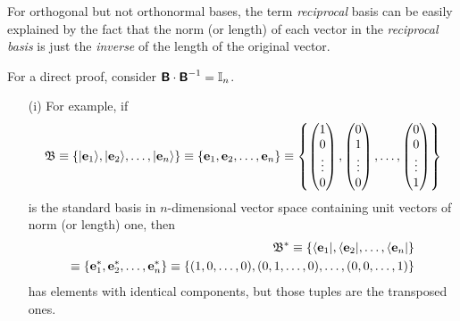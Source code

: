For orthogonal but not orthonormal bases, the term {\em reciprocal} basis
can be easily explained by the fact that the norm (or length) of each vector in the {\em reciprocal basis}
is just the {\em inverse} of the length of the original vector.

{\color{OliveGreen}
\bproof
For a direct proof, consider $\textsf{\textbf{B}}\cdot \textsf{\textbf{B}}^{-1} ={\Bbb I}_n$.
\eproof
}


{\color{blue}
\bexample
\begin{itemize}
\item[(i)]
For example,
if
\begin{equation}
{\frak B}
\equiv
\{ \vert {\bf e}_1 \rangle ,\vert  {\bf e}_2\rangle ,\ldots ,\vert {\bf e}_n\rangle  \}
\equiv
\{{\bf e}_1, {\bf e}_2,\ldots ,{\bf e}_n\}
\equiv
\left\{
\begin{pmatrix}
1\\
0\\
\vdots \\
0
\end{pmatrix}
,
\begin{pmatrix}
0\\
1\\
\vdots \\
0
\end{pmatrix}
,
\ldots ,
\begin{pmatrix}
0\\
0\\
\vdots \\
1
\end{pmatrix}
\right\}
\end{equation}
is the standard basis in $n$-dimensional vector space containing unit vectors of norm (or length) one,
then
\begin{equation}
\begin{split}
{\frak B}^\ast
\equiv
\{ \langle {\bf e}_1 \vert , \langle {\bf e}_2 \vert , \ldots ,\langle {\bf e}_n \vert \}
\\
\equiv
\{{\bf e}_1^\ast  ,{\bf e}_2^\ast , \ldots ,{\bf e}_n^\ast  \}
\equiv
\left\{
(1,0,\ldots,0),
(0,1,\ldots,0),
\ldots,
(0,0,\ldots,1)
\right\}
\end{split}
\end{equation}
has elements with identical components,
but those tuples are the transposed ones.


\end{itemize}}
